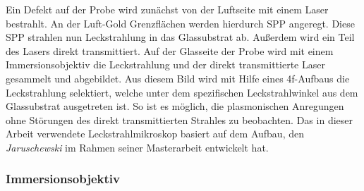 \documentclass[titlepage]{article}
\begin{document}
	Ein Defekt auf der Probe wird zunächst von der Luftseite mit einem Laser bestrahlt. An der Luft-Gold Grenzflächen werden hierdurch SPP angeregt. Diese SPP strahlen nun Leckstrahlung in das Glassubstrat ab.
	Außerdem wird ein Teil des Lasers direkt transmittiert. Auf der Glasseite der Probe wird mit einem Immersionsobjektiv die Leckstrahlung und der direkt transmittierte Laser gesammelt und abgebildet.	
	Aus diesem Bild wird mit Hilfe eines 4f-Aufbaus die Leckstrahlung selektiert, welche unter dem spezifischen Leckstrahlwinkel aus dem Glassubstrat ausgetreten ist. So ist es möglich, die plasmonischen Anregungen ohne Störungen des direkt transmittierten Strahles zu beobachten. Das in dieser Arbeit verwendete Leckstrahlmikroskop basiert auf dem Aufbau, den \textit{Jaruschewski} im Rahmen seiner Masterarbeit \cite{Jaruschewski.2020} entwickelt hat.
	\subsubsection{Immersionsobjektiv}
\end{document}
